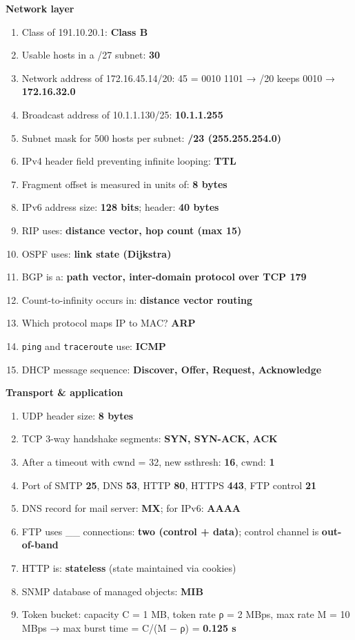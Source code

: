 \textbf{Network layer}

\begin{enumerate}
\def\labelenumi{\arabic{enumi}.}
\setcounter{enumi}{26}
\tightlist
\item
  Class of 191.10.20.1: \textbf{Class B}
\item
  Usable hosts in a /27 subnet: \textbf{30}
\item
  Network address of 172.16.45.14/20: 45 = 0010 1101 → /20 keeps 0010 → \textbf{172.16.32.0}
\item
  Broadcast address of 10.1.1.130/25: \textbf{10.1.1.255}
\item
  Subnet mask for 500 hosts per subnet: \textbf{/23 (255.255.254.0)}
\item
  IPv4 header field preventing infinite looping: \textbf{TTL}
\item
  Fragment offset is measured in units of: \textbf{8 bytes}
\item
  IPv6 address size: \textbf{128 bits}; header: \textbf{40 bytes}
\item
  RIP uses: \textbf{distance vector, hop count (max 15)}
\item
  OSPF uses: \textbf{link state (Dijkstra)}
\item
  BGP is a: \textbf{path vector, inter-domain protocol over TCP 179}
\item
  Count-to-infinity occurs in: \textbf{distance vector routing}
\item
  Which protocol maps IP to MAC? \textbf{ARP}
\item
  \texttt{ping} and \texttt{traceroute} use: \textbf{ICMP}
\item
  DHCP message sequence: \textbf{Discover, Offer, Request, Acknowledge}
\end{enumerate}

\textbf{Transport \& application}

\begin{enumerate}
\def\labelenumi{\arabic{enumi}.}
\setcounter{enumi}{41}
\tightlist
\item
  UDP header size: \textbf{8 bytes}
\item
  TCP 3-way handshake segments: \textbf{SYN, SYN-ACK, ACK}
\item
  After a timeout with cwnd = 32, new ssthresh: \textbf{16}, cwnd: \textbf{1}
\item
  Port of SMTP \textbf{25}, DNS \textbf{53}, HTTP \textbf{80}, HTTPS \textbf{443}, FTP control \textbf{21}
\item
  DNS record for mail server: \textbf{MX}; for IPv6: \textbf{AAAA}
\item
  FTP uses \_\_ connections: \textbf{two (control + data)}; control channel is \textbf{out-of-band}
\item
  HTTP is: \textbf{stateless} (state maintained via cookies)
\item
  SNMP database of managed objects: \textbf{MIB}
\item
  Token bucket: capacity C = 1 MB, token rate ρ = 2 MBps, max rate M = 10 MBps → max burst time = C/(M − ρ) = \textbf{0.125 s}
\end{enumerate}

